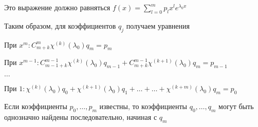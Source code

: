 \documentclass[12pt]{article}
\begin{document}
Это выражение должно равняться $f(x) = \sum\limits_{l = 0}^m p_l x^l e^{\lambda_0 x}$

Таким образом, для коэффициентов $q_j$ получаем уравнения 

При $x^m : C_{m + k}^m \chi^{(k)}(\lambda_0) q_m = p_m$

При $x^{m - 1} : C_{m - 1 + k}^{m - 1} \chi^{(k)}(\lambda_0) q_{m - 1} + C_{m + k}^{m - 1} \chi^{(k + 1)}(\lambda_0) q_m = p_{m - 1}$

$\ldots$

При $1 : \chi^{(k)}(\lambda_0) q_0 + \chi^{(k + 1)}(\lambda_0) q_1 + \ldots + \ldots + \chi^{(k + m)}(\lambda_0) q_m = p_0$

Если коэффициенты $p_0, \ldots, p_m$ известны, то коэффициенты $q_0, \ldots, q_m$ могут быть однозначно найдены последовательно, начиная с $q_m$
\end{document}
